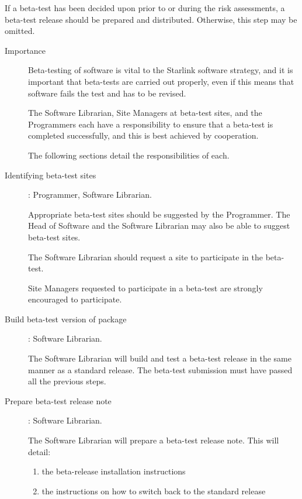 \documentclass[twoside,11pt]{article}
\begin{document}
If a beta-test has been decided upon prior to or during the risk
assessments, a beta-test release should be prepared and distributed.
Otherwise, this step may be omitted.

\begin{description}

\item[Importance]\mbox{}

Beta-testing of software is vital to the Starlink software strategy,
and it is important that beta-tests are carried out properly, even
if this means that software fails the test and has to be revised.

The Software Librarian, Site Managers at beta-test sites, and the
Programmers each have a responsibility to ensure that a beta-test is
completed successfully, and this is best achieved by cooperation.

The following sections detail the responsibilities of each.

\item[Identifying beta-test sites]: Programmer, Software Librarian.

Appropriate beta-test sites should be suggested by the Programmer.  The
Head of Software and the Software Librarian may also be able to suggest
beta-test sites.

The Software Librarian should request a site to participate in
the beta-test.

Site Managers requested to participate in a beta-test are strongly
encouraged to participate.

\item[Build beta-test version of package]: Software Librarian.

The Software Librarian will build and test a beta-test release in the
same manner as a standard release.  The beta-test submission must have
passed all the previous steps.

\item[Prepare beta-test release note]: Software Librarian.

The Software Librarian will prepare a beta-test release note.  This
will detail:

\begin{enumerate}

\item the beta-release installation instructions

\item the instructions on how to switch back to the standard release


\end{enumerate}
\end{description}
\end{document}
